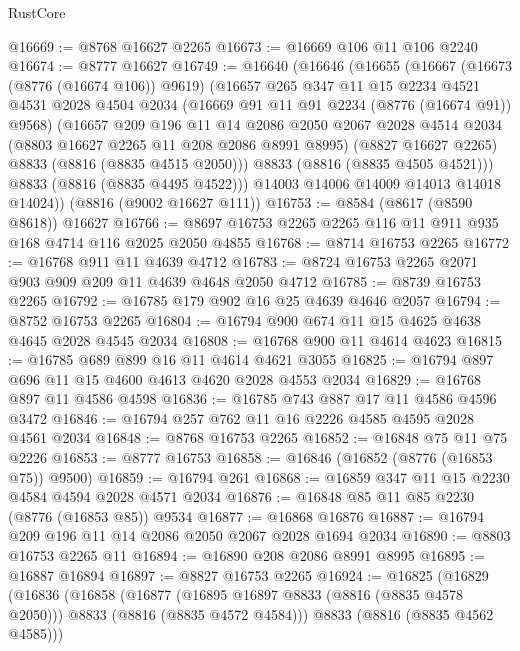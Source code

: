 \begin{lexlean}{RustCore}
\begin{coremodule}
@16669 := @8768 @16627 @2265
@16673 := @16669 @106 @11 @106 @2240
@16674 := @8777 @16627
@16749 := @16640
    (@16646
      (@16655
        (@16667
          (@16673 (@8776 (@16674 @106)) @9619)
          (@16657
            @265
            @347
            @11
            @15
            @2234
            @4521
            @4531
            @2028
            @4504
            @2034
            (@16669 @91 @11 @91 @2234 (@8776 (@16674 @91)) @9568)
            (@16657
              @209
              @196
              @11
              @14
              @2086
              @2050
              @2067
              @2028
              @4514
              @2034
              (@8803 @16627 @2265 @11 @208 @2086 @8991 @8995)
              (@8827 @16627 @2265)
              @8833
              (@8816 (@8835 @4515 @2050)))
            @8833
            (@8816 (@8835 @4505 @4521)))
          @8833
          (@8816 (@8835 @4495 @4522)))
        @14003
        @14006
        @14009
        @14013
        @14018
        @14024))
    (@8816 (@9002 @16627 @111))
@16753 := @8584 (@8617 (@8590 @8618)) @16627
@16766 := @8697 @16753 @2265 @2265 @116 @11 @911 @935 @168 @4714 @116 @2025 @2050 @4855
@16768 := @8714 @16753 @2265
@16772 := @16768 @911 @11 @4639 @4712
@16783 := @8724 @16753 @2265 @2071 @903 @909 @209 @11 @4639 @4648 @2050 @4712
@16785 := @8739 @16753 @2265
@16792 := @16785 @179 @902 @16 @25 @4639 @4646 @2057
@16794 := @8752 @16753 @2265
@16804 := @16794 @900 @674 @11 @15 @4625 @4638 @4645 @2028 @4545 @2034
@16808 := @16768 @900 @11 @4614 @4623
@16815 := @16785 @689 @899 @16 @11 @4614 @4621 @3055
@16825 := @16794 @897 @696 @11 @15 @4600 @4613 @4620 @2028 @4553 @2034
@16829 := @16768 @897 @11 @4586 @4598
@16836 := @16785 @743 @887 @17 @11 @4586 @4596 @3472
@16846 := @16794 @257 @762 @11 @16 @2226 @4585 @4595 @2028 @4561 @2034
@16848 := @8768 @16753 @2265
@16852 := @16848 @75 @11 @75 @2226
@16853 := @8777 @16753
@16858 := @16846 (@16852 (@8776 (@16853 @75)) @9500)
@16859 := @16794 @261
@16868 := @16859 @347 @11 @15 @2230 @4584 @4594 @2028 @4571 @2034
@16876 := @16848 @85 @11 @85 @2230 (@8776 (@16853 @85)) @9534
@16877 := @16868 @16876
@16887 := @16794 @209 @196 @11 @14 @2086 @2050 @2067 @2028 @1694 @2034
@16890 := @8803 @16753 @2265 @11
@16894 := @16890 @208 @2086 @8991 @8995
@16895 := @16887 @16894
@16897 := @8827 @16753 @2265
@16924 := @16825
    (@16829
      (@16836
        (@16858
          (@16877
            (@16895 @16897 @8833 (@8816 (@8835 @4578 @2050)))
            @8833
            (@8816 (@8835 @4572 @4584)))
          @8833
          (@8816 (@8835 @4562 @4585)))

\end{coremodule}
\end{lexlean}
